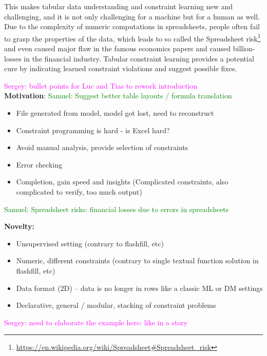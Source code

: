 \documentclass{ecai}
\newcommand{\sergey}[1]{\textcolor{magenta}{{\sc Sergey:} #1}\xspace}
\newcommand{\samuel}[1]{\textcolor{green}{{\sc Samuel:} #1}\xspace}
\begin{document}
This makes tabular data understanding and constraint learning new and challenging, and it is not only challenging for a machine but for a human as well. Due to the complexity of numeric computations in spreadsheets, people often fail to grasp the properties of the data, which leads to so called the Spreadsheet risk\footnote{\url{https://en.wikipedia.org/wiki/Spreadsheet\#Spreadsheet_risk}} and even caused major flaw in the famous economics papers \cite{flaw_excel} and caused billion-losses in the financial industry. Tabular constraint learning provides a potential cure by indicating learned constraint violations and suggest possible fixes.

\sergey{bullet points for Luc and Tias to rework introduction}\\
\textbf{Motivation}:
\samuel{Suggest better table layouts / formula translation}
\begin{itemize}
  \item File generated from model, model got lost, need to reconstruct
  \item Constraint programming is hard - is Excel hard?
  \item Avoid manual analysis, provide selection of constraints
  \item Error checking
  \item Completion, gain speed and insights (Complicated constraints, also complicated to verify, too much output)
\end{itemize}

\samuel{Spreadsheet risks: financial losses due to errors in spreadsheets}

\textbf{Novelty:}
\begin{itemize}
  \item Unsupervised setting (contrary to flashfill, etc)
  \item Numeric, different constraints (contrary to single textual function solution in flashfill, etc)
  \item Data format (2D) -- data is no longer in rows like a classic ML or DM settings
  \item Declarative, general / modular, stacking of constraint problems 
\end{itemize}

\sergey{need to elaborate the example here: like in a story} 
\end{document}
